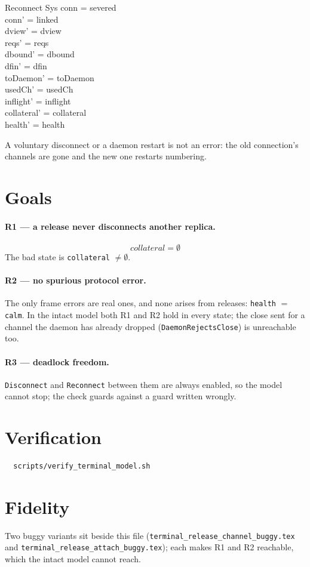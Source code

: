\documentclass[a4paper,10pt,fleqn]{article}
\begin{document}
\begin{schema}{Reconnect}
  \Delta Sys
\where
  conn = severed \\
  conn' = linked \\
  dview' = dview \\
  reqs' = reqs \\
  dbound' = dbound \\
  dfin' = dfin \\
  toDaemon' = toDaemon \\
  usedCh' = usedCh \\
  inflight' = inflight \\
  collateral' = collateral \\
  health' = health
\end{schema}

A voluntary disconnect or a daemon restart is not an error: the old
connection's channels are gone and the new one restarts numbering.

\section{Goals}

\paragraph{R1 --- a release never disconnects another replica.}
\[
  collateral = \emptyset
\]
The bad state is \texttt{collateral} $\neq \emptyset$.

\paragraph{R2 --- no spurious protocol error.}
The only frame errors are real ones, and none arises from releases:
\texttt{health} $= $ \texttt{calm}.  In the intact model both R1 and R2
hold in every state; the close sent for a channel the daemon has already
dropped (\texttt{DaemonRejectsClose}) is unreachable too.

\paragraph{R3 --- deadlock freedom.}
\texttt{Disconnect} and \texttt{Reconnect} between them are always enabled, so
the model cannot stop; the check guards against a guard written wrongly.

\section{Verification}

\begin{verbatim}
  scripts/verify_terminal_model.sh
\end{verbatim}

\section{Fidelity}

Two buggy variants sit beside this file (\texttt{terminal\_release\_channel\_buggy.tex} and \texttt{terminal\_release\_attach\_buggy.tex}); each makes R1 and R2 reachable, which the intact model cannot reach.
\end{document}
